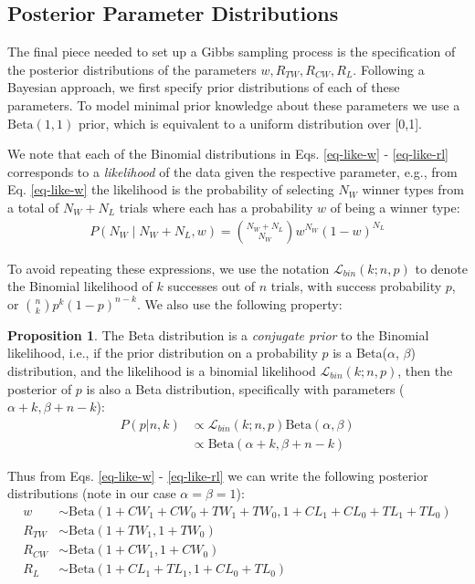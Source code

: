 \documentclass[11pt,a4paper]{article}
\theoremstyle{definition}
\theoremstyle{remark}
\theoremstyle{definition}
\theoremstyle{definition}
\theoremstyle{definition}
\theoremstyle{definition}
\theoremstyle{definition}
\theoremstyle{definition}
\newtheorem{proposition}[theorem]{Proposition}
\begin{document}
\subsection{Posterior Parameter Distributions}
The final piece needed to set up a Gibbs sampling process is the specification of the posterior distributions of the parameters $w, R_{TW}, R_{CW}, R_L$.
Following a Bayesian approach, we first specify prior distributions of each of these parameters. To model minimal prior knowledge about these parameters we use a $\text{Beta}(1,1)$ prior, which is equivalent to a uniform distribution over [0,1]. 

We note that each of the Binomial distributions in Eqs. \ref{eq-like-w} - \ref{eq-like-rl} corresponds to a \textit{likelihood} of the data given the respective parameter, e.g., from Eq. \ref{eq-like-w} the likelihood is the probability of selecting $N_W$ winner types from a total of $N_W + N_L$ trials where each has a probability $w$ of being a winner type:
\begin{eqnarray}
P(N_W \; | \; 	N_W + N_L, w) = {N_W + N_L \choose N_W} w^{N_W} (1-w)^{N_L}
\end{eqnarray}

To avoid repeating these expressions, we use the notation 
$\mathcal{L}_{bin}(k; n, p)$
 to denote the Binomial likelihood of $k$ successes out of $n$ trials, with success probability $p$, or ${n \choose k}p^k (1-p)^{n-k}$. We also use the following property: 
 
\begin{proposition} \label{prop-conj}\small
The Beta distribution is a \textit{conjugate prior} to the Binomial likelihood, i.e., if the prior distribution on a probability $p$ is a Beta($\alpha$, $\beta$) distribution, and the likelihood is a binomial likelihood $\mathcal{L}_{bin}(k; n,p)$, then the posterior of $p$ is also a Beta distribution, specifically with parameters ($\alpha + k, \beta + n-k$):
\begin{eqnarray}
P(p | n, k) &\propto  \mathcal{L}_{bin}(k; n,p) \text{Beta}(\alpha, \beta)\\	& \propto  \text{Beta}(\alpha + k, \beta + n-k)
\end{eqnarray}
\end{proposition}
	
Thus from Eqs. \ref{eq-like-w} - \ref{eq-like-rl} we can write the following posterior distributions (note in our case $\alpha=\beta=1$):
\newcommand{\betadist}{\text{Beta}}
\begin{equation} \label{eq-post}
\begin{split}
w &\sim  \betadist(1 + CW_1 + CW_0 + TW_1 + TW_0,
					  1 + CL_1 + CL_0 + TL_1 + TL_0) \\
R_{TW} & \sim 	\betadist(1 + TW_1, 1 + TW_0) \\
R_{CW} & \sim  \betadist(1 + CW_1, 1 + CW_0) \\
R_L & \sim  \betadist(1 + CL_1 + TL_1, 1 + CL_0 + TL_0)	
\end{split}
\end{equation}
\end{document}
